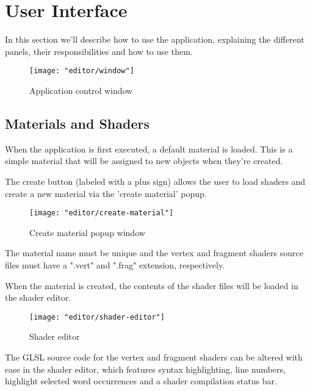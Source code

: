 \section{User Interface}
In this section we'll describe how to use the application, explaining the different panels, their responsibilities and how to use them.

\begin{figure}[ht]
    \caption{Application control window}
    \begin{center}
        \texttt{[image: "editor/window"]}
    \end{center}
    \label{fig:window}
\end{figure}


\subsection{Materials and Shaders}
When the application is first executed, a default material is loaded. This is a simple material that will be assigned to new objects when they're created.

The create button (labeled with a plus sign) allows the user to load shaders and create a new material via the 'create material' popup.

\begin{figure}
    \caption{Create material popup window}
    \begin{center}
        \texttt{[image: "editor/create-material"]}
    \end{center}
    \label{fig:create-material}
\end{figure}

The material name must be unique and the vertex and fragment shaders source files must have a ".vert" and ".frag" extension, respectively.

When the material is created, the contents of the shader files will be loaded in the shader editor.

\begin{figure}
    \centering
    \caption{Shader editor}
    \texttt{[image: "editor/shader-editor"]}
    \label{fig:shader-editor}
\end{figure}

The GLSL source code for the vertex and fragment shaders can be altered with ease in the shader editor, which features syntax highlighting, line numbers, highlight selected word occurrences and a shader compilation status bar.

